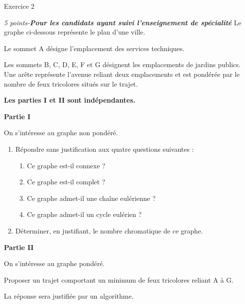 
%
\begin{h2}Exercice 2\end{h2}
\textit{5 points-\textbf{Pour les candidats ayant  suivi l'enseignement de spécialité}}
Le graphe ci-dessous représente le plan d'une ville.
\par
Le sommet A désigne l'emplacement des services techniques.
\par
Les sommets B, C, D, E, F et G désignent les emplacements de jardins publics. Une arête représente l'avenue reliant deux emplacements et est pondérée par le nombre de feux tricolores situés sur le trajet.

\begin{center}
\end{center}
\textbf{Les parties I et II sont indépendantes.}
\par
\textbf{Partie I}
\par
On s'intéresse au graphe non pondéré.
\begin{enumerate}
     \item
     Répondre sans justification aux quatre questions suivantes :
     \begin{enumerate}[label=\alph*.]
          \item
          Ce graphe est-il connexe ?
          \item
          Ce graphe est-il complet ?
          \item
          Ce graphe admet-il une chaîne eulérienne ?
          \item
          Ce graphe admet-il un cycle eulérien ?
     \end{enumerate}
     \item
     Déterminer, en justifiant, le nombre chromatique de ce graphe.
\end{enumerate}
\par      
\textbf{Partie II}
\par
On s'intéresse au graphe pondéré.
\par
Proposer un trajet comportant un minimum de feux tricolores reliant A à G.
\par
La réponse sera justifiée par un algorithme.
